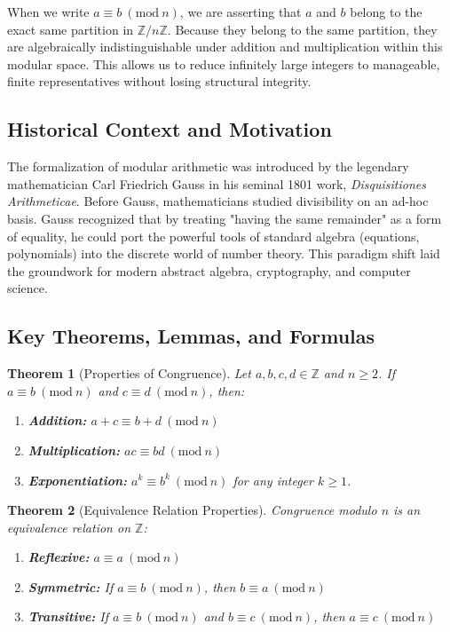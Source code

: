 \documentclass[11pt]{article}
\newtheorem{theorem}{Theorem}[section]
\newcommand{\Z}{\mathbb{Z}}
\newcommand{\modulo}[1]{\ (\mathrm{mod}\ #1)}
\begin{document}
When we write $a \equiv b \modulo{n}$, we are asserting that $a$ and $b$ belong to the exact same partition in $\Z/n\Z$. Because they belong to the same partition, they are algebraically indistinguishable under addition and multiplication within this modular space. This allows us to reduce infinitely large integers to manageable, finite representatives without losing structural integrity.

\subsection{Historical Context and Motivation}
The formalization of modular arithmetic was introduced by the legendary mathematician Carl Friedrich Gauss in his seminal 1801 work, \textit{Disquisitiones Arithmeticae}. Before Gauss, mathematicians studied divisibility on an ad-hoc basis. Gauss recognized that by treating "having the same remainder" as a form of equality, he could port the powerful tools of standard algebra (equations, polynomials) into the discrete world of number theory. This paradigm shift laid the groundwork for modern abstract algebra, cryptography, and computer science.

\subsection{Key Theorems, Lemmas, and Formulas}
\begin{theorem}[Properties of Congruence]
Let $a, b, c, d \in \Z$ and $n \geq 2$. If $a \equiv b \modulo{n}$ and $c \equiv d \modulo{n}$, then:
\begin{enumerate}
    \item \textbf{Addition:} $a + c \equiv b + d \modulo{n}$
    \item \textbf{Multiplication:} $ac \equiv bd \modulo{n}$
    \item \textbf{Exponentiation:} $a^k \equiv b^k \modulo{n}$ for any integer $k \geq 1$.
\end{enumerate}
\end{theorem}

\begin{theorem}[Equivalence Relation Properties]
Congruence modulo $n$ is an equivalence relation on $\Z$:
\begin{enumerate}
    \item \textbf{Reflexive:} $a \equiv a \modulo{n}$
    \item \textbf{Symmetric:} If $a \equiv b \modulo{n}$, then $b \equiv a \modulo{n}$
    \item \textbf{Transitive:} If $a \equiv b \modulo{n}$ and $b \equiv c \modulo{n}$, then $a \equiv c \modulo{n}$
\end{enumerate}
\end{theorem}
\end{document}
